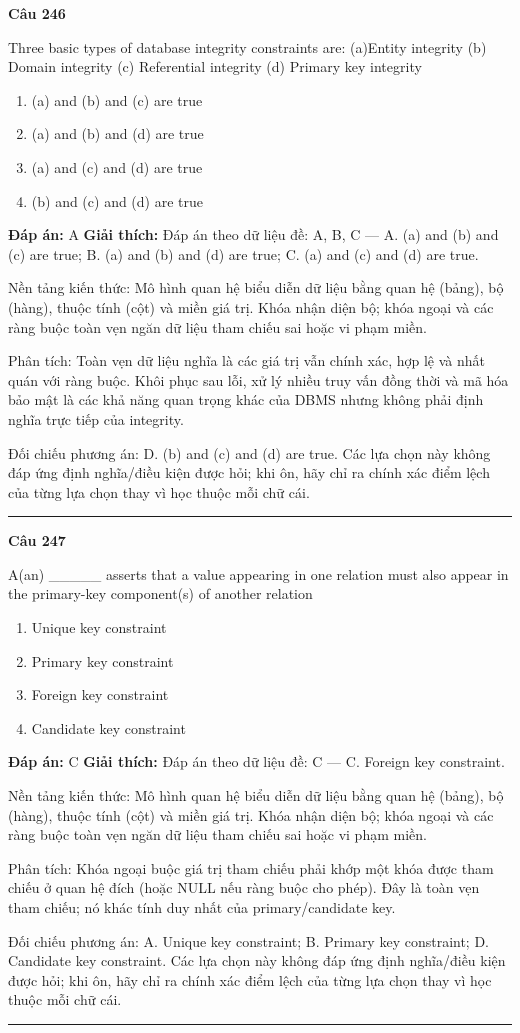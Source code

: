 \documentclass[11pt,a4paper]{article}
\newenvironment{question}[1]{%
  \par\vspace{1em}\noindent\textbf{\large Câu #1}\par\vspace{0.4em}
}{%
  \par\vspace{1em}\hrule\vspace{0.6em}
}
\newenvironment{choices}{%
  \begin{enumerate}[label=\textbf{\Alph*.},leftmargin=2.2em,itemsep=2pt,topsep=3pt]
}{%
  \end{enumerate}
}
\newcommand{\choice}{\item}
\begin{document}
\begin{question}{246}
Three basic types of database integrity constraints are:
(a)Entity integrity
(b) Domain integrity
(c) Referential integrity
(d) Primary key integrity
\begin{choices}
\choice (a) and (b) and (c) are true
\choice (a) and (b) and (d) are true
\choice (a) and (c) and (d) are true
\choice (b) and (c) and (d) are true
\end{choices}
\textbf{Đáp án:} A
\textbf{Giải thích:} Đáp án theo dữ liệu đề: A, B, C — A. (a) and (b) and (c) are true; B. (a) and (b) and (d) are true; C. (a) and (c) and (d) are true.

Nền tảng kiến thức: Mô hình quan hệ biểu diễn dữ liệu bằng quan hệ (bảng), bộ (hàng), thuộc tính (cột) và miền giá trị. Khóa nhận diện bộ; khóa ngoại và các ràng buộc toàn vẹn ngăn dữ liệu tham chiếu sai hoặc vi phạm miền.

Phân tích: Toàn vẹn dữ liệu nghĩa là các giá trị vẫn chính xác, hợp lệ và nhất quán với ràng buộc. Khôi phục sau lỗi, xử lý nhiều truy vấn đồng thời và mã hóa bảo mật là các khả năng quan trọng khác của DBMS nhưng không phải định nghĩa trực tiếp của integrity.

Đối chiếu phương án: D. (b) and (c) and (d) are true. Các lựa chọn này không đáp ứng định nghĩa/điều kiện được hỏi; khi ôn, hãy chỉ ra chính xác điểm lệch của từng lựa chọn thay vì học thuộc mỗi chữ cái.
\end{question}

\begin{question}{247}
A(an) _____ asserts that a value appearing in one relation must also appear in the primary-key component(s) of another relation
\begin{choices}
\choice Unique key constraint
\choice Primary key constraint
\choice Foreign key constraint
\choice Candidate key constraint
\end{choices}
\textbf{Đáp án:} C
\textbf{Giải thích:} Đáp án theo dữ liệu đề: C — C. Foreign key constraint.

Nền tảng kiến thức: Mô hình quan hệ biểu diễn dữ liệu bằng quan hệ (bảng), bộ (hàng), thuộc tính (cột) và miền giá trị. Khóa nhận diện bộ; khóa ngoại và các ràng buộc toàn vẹn ngăn dữ liệu tham chiếu sai hoặc vi phạm miền.

Phân tích: Khóa ngoại buộc giá trị tham chiếu phải khớp một khóa được tham chiếu ở quan hệ đích (hoặc NULL nếu ràng buộc cho phép). Đây là toàn vẹn tham chiếu; nó khác tính duy nhất của primary/candidate key.

Đối chiếu phương án: A. Unique key constraint; B. Primary key constraint; D. Candidate key constraint. Các lựa chọn này không đáp ứng định nghĩa/điều kiện được hỏi; khi ôn, hãy chỉ ra chính xác điểm lệch của từng lựa chọn thay vì học thuộc mỗi chữ cái.
\end{question}
\end{document}
